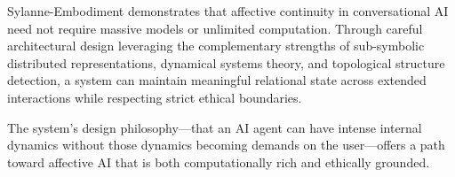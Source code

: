 \documentclass[10pt,twocolumn]{article}
\begin{document}
Sylanne-Embodiment demonstrates that affective continuity in conversational AI need not require massive models or unlimited computation. Through careful architectural design leveraging the complementary strengths of sub-symbolic distributed representations, dynamical systems theory, and topological structure detection, a system can maintain meaningful relational state across extended interactions while respecting strict ethical boundaries.

The system's design philosophy---that an AI agent can have intense internal dynamics without those dynamics becoming demands on the user---offers a path toward affective AI that is both computationally rich and ethically grounded.

\balance


\end{document}
